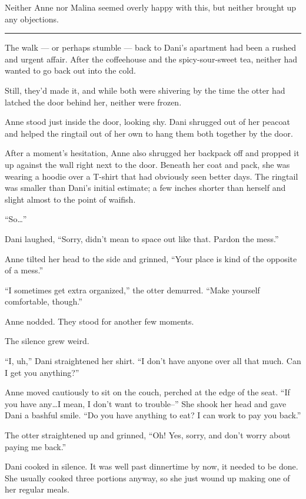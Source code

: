 Neither Anne nor Malina seemed overly happy with this, but neither brought up any objections.

\begin{center}\rule{0.5\linewidth}{\linethickness}\end{center}

The walk --- or perhaps stumble --- back to Dani's apartment had been a rushed and urgent affair. After the coffeehouse and the spicy-sour-sweet tea, neither had wanted to go back out into the cold.

Still, they'd made it, and while both were shivering by the time the otter had latched the door behind her, neither were frozen.

Anne stood just inside the door, looking shy. Dani shrugged out of her peacoat and helped the ringtail out of her own to hang them both together by the door.

After a moment's hesitation, Anne also shrugged her backpack off and propped it up against the wall right next to the door. Beneath her coat and pack, she was wearing a hoodie over a T-shirt that had obviously seen better days. The ringtail was smaller than Dani's initial estimate; a few inches shorter than herself and slight almost to the point of waifish.

``So\ldots{}''

Dani laughed, ``Sorry, didn't mean to space out like that. Pardon the mess.''

Anne tilted her head to the side and grinned, ``Your place is kind of the opposite of a mess.''

``I sometimes get extra organized,'' the otter demurred. ``Make yourself comfortable, though.''

Anne nodded. They stood for another few moments.

The silence grew weird.

``I, uh,'' Dani straightened her shirt. ``I don't have anyone over all that much. Can I get you anything?''

Anne moved cautiously to sit on the couch, perched at the edge of the seat. ``If you have any\ldots{}I mean, I don't want to trouble--'' She shook her head and gave Dani a bashful smile. ``Do you have anything to eat? I can work to pay you back.''

The otter straightened up and grinned, ``Oh! Yes, sorry, and don't worry about paying me back.''

Dani cooked in silence. It was well past dinnertime by now, it needed to be done. She usually cooked three portions anyway, so she just wound up making one of her regular meals.

